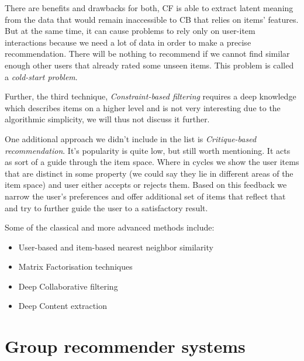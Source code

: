 There are benefits and drawbacks for both, CF is able to extract latent meaning from the data that would remain inaccessible to CB that relies on items' features. But at the same time, it can cause problems to rely only on user-item interactions because we need a lot of data in order to make a precise recommendation. There will be nothing to recommend if we cannot find similar enough other users that already rated some unseen items. This problem is called a \textit{cold-start problem}.

Further, the third technique, \textit{Constraint-based filtering} requires a deep knowledge which describes items on a higher level and is not very interesting due to the algorithmic simplicity, we will thus not discuss it further.

One additional approach we didn't include in the list is \textit{Critique-based recommendation}. It's popularity is quite low, but still worth mentioning. It acts as sort of a guide through the item space. Where in cycles we show the user items that are distinct in some property (we could say they lie in different areas of the item space) and user either accepts or rejects them. Based on this feedback we narrow the user's preferences and offer additional set of items that reflect that and try to further guide the user to a satisfactory result.
\newline

Some of the classical and more advanced methods include:
\begin{itemize}
    \item User-based and item-based nearest neighbor similarity \cite{hill1995recommending}\cite{shardanand1995social}\cite{balabanovic1997fab}
    \item Matrix Factorisation techniques\cite{koren2009matrix}
    \item Deep Collaborative filtering \cite{he2017neural}\cite{YOUTUBE_deeprec-covington2016}\cite{DeepLearningBasedRecommenderSystem_zhang2019deep}
    \item Deep Content extraction\cite{DeepLearningBasedRecommenderSystem_zhang2019deep}
\end{itemize}




\section{Group recommender systems} \label{sec:01_group_rec_sys}
